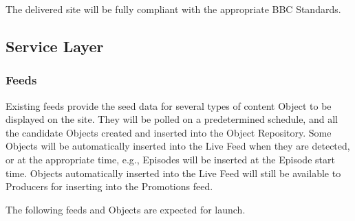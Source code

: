 \documentclass[a4paper, 11pt]{scrreprt}
\begin{document}
The delivered site will be fully compliant with the appropriate BBC Standards.


\subsection{Service Layer}
\label{h.6l6n7ooy4jkq}

\subsubsection{Feeds}
\label{h.in788vjoh5u8}
Existing feeds provide the seed data for several types of content Object to be displayed on the site. They will be polled on a predetermined schedule, and all the candidate Objects created and inserted into the Object Repository. Some Objects will be automatically inserted into the Live Feed when they are detected, or at the appropriate time, e.g., Episodes will be inserted at the Episode start time. Objects automatically inserted into the Live Feed will still be available to Producers for inserting into the Promotions feed.

The following feeds and Objects are expected for launch. 
\end{document}
